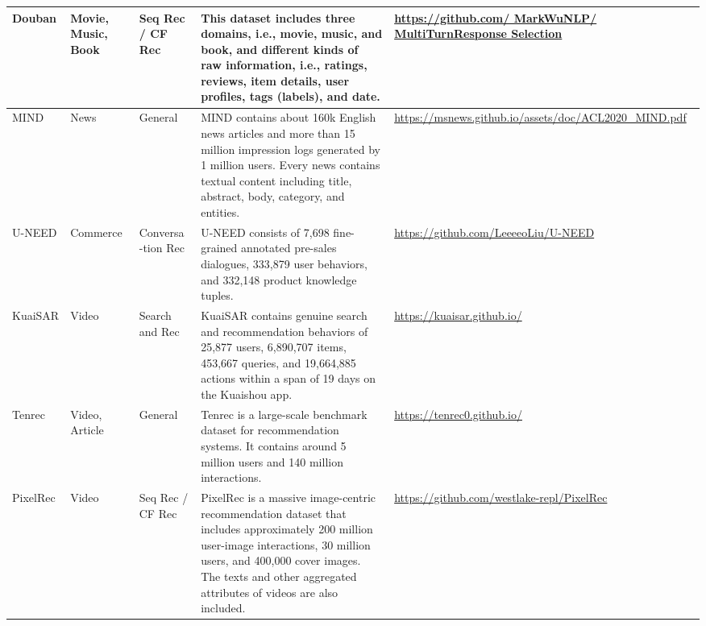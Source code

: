 \documentclass[sn-mathphys-num]{sn-jnl}%
\theoremstyle{thmstyleone}%
\theoremstyle{thmstyletwo}%
\theoremstyle{thmstylethree}%
\begin{document}
\begin{table}[!ht]
\begin{tabular}{m{1.1cm}<{\centering}|m{1.15cm}|m{1.15cm}|m{4.9cm}|m{2.2cm}}
        Douban \cite{wu2017sequential} & Movie, Music, Book  & Seq Rec / CF Rec & This dataset includes three domains, i.e., movie, music, and book, and different kinds of raw information, i.e., ratings, reviews, item details, user profiles, tags (labels), and date. &  \href{https://github.com/MarkWuNLP/MultiTurnResponseSelection}{https://github.com/ MarkWuNLP/ MultiTurnResponse Selection}  \\ 
        \hline
        MIND \cite{wu2020mind} & News  & General & MIND contains about 160k English news articles and more than 15 million impression logs generated by 1 million users. Every news contains textual content including title, abstract, body, category, and entities. &  \url{https://msnews.github.io/assets/doc/ACL2020_MIND.pdf}  \\
        \hline
        U-NEED \cite{liu2023u} & Commerce  & Conversa -tion Rec & U-NEED consists of 7,698 fine-grained annotated pre-sales dialogues, 333,879 user behaviors, and 332,148 product knowledge tuples. &  \url{https://github.com/LeeeeoLiu/U-NEED}  \\
        \hline
        KuaiSAR \cite{Sun2023KuaiSAR} & Video  & Search and Rec & KuaiSAR contains genuine search and recommendation behaviors of 25,877 users, 6,890,707 items, 453,667 queries, and 19,664,885 actions within a span of 19 days on the Kuaishou app. &  \url{https://kuaisar.github.io/}  \\
        \hline
        Tenrec \cite{yuan2022tenrec} & Video, Article  & General & Tenrec is a large-scale benchmark dataset for recommendation systems. It contains around 5 million users and 140 million interactions. &  \url{https://tenrec0.github.io/}  \\
        \hline
        PixelRec \cite{cheng2023image} & Video  & Seq Rec / CF Rec & PixelRec is a massive image-centric recommendation dataset that includes approximately 200 million user-image interactions, 30 million users, and 400,000 cover images.  The texts and other aggregated attributes of videos are also included. &  \url{https://github.com/westlake-repl/PixelRec}  \\
        \hline
    \end{tabular}
    
    \label{tab:data}
\end{table}
\end{document}
